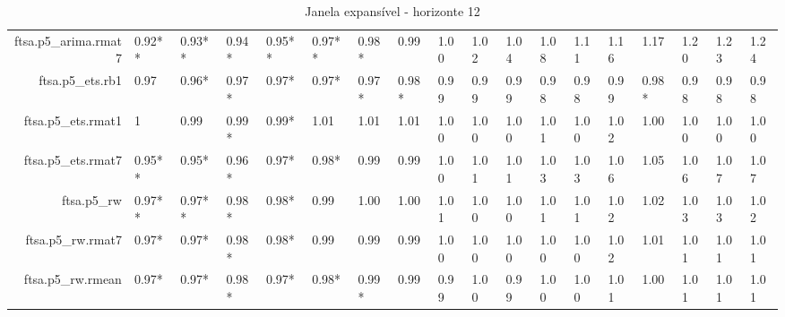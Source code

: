 \begin{table}[ht]
{\begin{tabular}{rlllllllllllllllll}
  ftsa.p5\_arima.rmat7 & 0.92** & 0.93** & 0.94* & 0.95** & 0.97** & 0.98* & 0.99 & 1.00 & 1.02 & 1.04 & 1.08 & 1.11 & 1.16 & 1.17 & 1.20 & 1.23 & 1.24 \\ 
  ftsa.p5\_ets.rb1 & 0.97 & 0.96* & 0.97* & 0.97* & 0.97* & 0.97* & 0.98* & 0.99 & 0.99 & 0.99 & 0.98 & 0.98 & 0.99 & 0.98* & 0.98 & 0.98 & 0.98 \\ 
  ftsa.p5\_ets.rmat1 & 1 & 0.99 & 0.99* & 0.99* & 1.01 & 1.01 & 1.01 & 1.00 & 1.00 & 1.00 & 1.01 & 1.00 & 1.02 & 1.00 & 1.00 & 1.00 & 1.00 \\ 
  ftsa.p5\_ets.rmat7 & 0.95** & 0.95* & 0.96* & 0.97* & 0.98* & 0.99 & 0.99 & 1.00 & 1.01 & 1.01 & 1.03 & 1.03 & 1.06 & 1.05 & 1.06 & 1.07 & 1.07 \\ 
  ftsa.p5\_rw & 0.97** & 0.97** & 0.98* & 0.98* & 0.99 & 1.00 & 1.00 & 1.01 & 1.00 & 1.00 & 1.01 & 1.01 & 1.02 & 1.02 & 1.03 & 1.03 & 1.02 \\ 
  ftsa.p5\_rw.rmat7 & 0.97* & 0.97* & 0.98* & 0.98* & 0.99 & 0.99 & 0.99 & 1.00 & 1.00 & 1.00 & 1.00 & 1.00 & 1.02 & 1.01 & 1.01 & 1.01 & 1.01 \\ 
  ftsa.p5\_rw.rmean & 0.97* & 0.97* & 0.98* & 0.97* & 0.98* & 0.99* & 0.99 & 0.99 & 1.00 & 0.99 & 1.00 & 1.00 & 1.01 & 1.00 & 1.01 & 1.01 & 1.01 \\ 
   \hline
\end{tabular}
}
\caption{Janela expansível - horizonte 12} 
\end{table}

